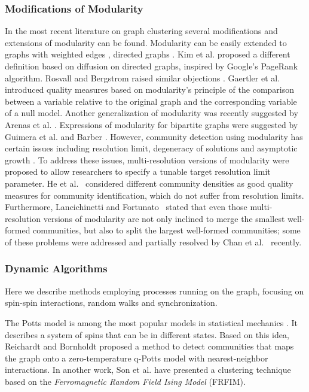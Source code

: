 \subsubsection*{Modifications of Modularity}
In the most recent literature on graph clustering several modifications and extensions of modularity can be found. Modularity can be easily
extended to graphs with weighted edges \cite{PhysRevE.70}, directed graphs \cite{Phys118703}. Kim et al. \cite{KSJ} proposed a
different definition based on diffusion on directed graphs, inspired by Google's PageRank algorithm. Rosvall and Bergstrom raised similar
objections \cite{Rosvall290}. Gaertler et al. \cite{Gaertler:2007} introduced quality measures based on modularity's principle of the
comparison between a variable relative to the original graph and the corresponding variable of a null model. Another generalization of
modularity was recently suggested by
Arenas et al. \cite{Arenas2007Motif}. Expressions of modularity for bipartite graphs were suggested by Guimera et al. \cite{Guimera:2007}
and
Barber \cite{barber2007mac}. However, community detection using modularity has certain issues including resolution limit,
degeneracy of solutions and asymptotic growth \cite{gmc2010}. To address these issues, multi-resolution versions of modularity
\cite{Arenas} were proposed to allow researchers to specify a tunable target resolution limit parameter. He et al.~\cite{Dongxiao}
considered different community densities as good quality measures for community identification, which do not suffer from resolution limits. 
Furthermore, Lancichinetti and Fortunato~\cite{santo_11} stated that even those multi-resolution versions of modularity are not only
inclined to merge the smallest well-formed communities, but also to split the largest well-formed communities; some of these problems were
addressed and partially resolved by Chan et al.~\cite{Chen_2013} recently. 

\subsubsection*{Dynamic Algorithms}
Here we describe methods employing processes running on the graph, focusing on spin-spin interactions, random walks and synchronization.

 The Potts model is among the most popular models in statistical mechanics \cite{Wu235}. It describes a
system of spins that can be in
different states. Based on this idea, Reichardt and Bornholdt
\cite{reichardt2004} proposed a method to detect communities that maps the graph onto a zero-temperature q-Potts model with nearest-neighbor
interactions. In another work, Son et al. \cite{SonSW} have presented a clustering technique based on the {\em Ferromagnetic Random
Field Ising Model} (FRFIM).

